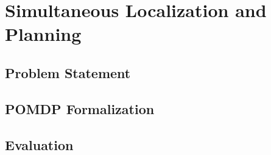 \chapter{Simultaneous Localization and Planning}\label{chap:localization-and-planning}

\section{Problem Statement}
\section{POMDP Formalization}
\section{Evaluation}
